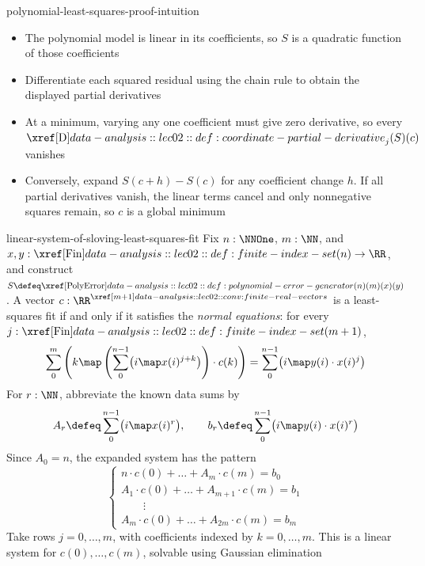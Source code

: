 \documentclass[12pt]{article}
\numberwithin{figure}{section}
\begin{document}
\begin{rem}{polynomial-least-squares-proof-intuition}
    \begin{itemize}[nosep]
        \item The polynomial model is linear in its coefficients, so $S$
            is a quadratic function of those coefficients
        \item Differentiate each squared residual using the chain rule
            to obtain the displayed partial derivatives
        \item At a minimum, varying any one coefficient must give zero
            derivative, so every $\PartialD_j(S)(c)$ vanishes
        \item Conversely, expand $S(c+h)-S(c)$ for any coefficient change
            $h$. If all partial derivatives vanish, the linear terms
            cancel and only nonnegative squares remain, so $c$ is a
            global minimum
    \end{itemize}
\end{rem}

\begin{thm}{linear-system-of-sloving-least-squares-fit}
    \hypertarget{notes.conv.linear-system-of-sloving-least-squares-fit}{}
    \label{conv:linear-system-of-sloving-least-squares-fit}
    Fix $n:\NNOne$, $m:\NN$, and $x,y:\Fin(n)\to\RR$, and construct
    $S\defeq\PolyError(n)(m)(x)(y)$. A vector $c:\RealVectors{m+1}$
    is a least-squares fit if and only if it satisfies the
    \emph{normal equations}: for every $j:\Fin(m+1)$,
    \[
      \sum_0^m\left(k\map
        \left(\sum_0^{n-1}\bigl(i\map x(i)^{j+k}\bigr)\right)
        \cdot c(k)\right)
      =\sum_0^{n-1}\bigl(i\map y(i)\cdot x(i)^j\bigr)
    \]
    For $r:\NN$, abbreviate the known data sums by
    \[
      A_r\defeq\sum_0^{n-1}\bigl(i\map x(i)^r\bigr),\qquad
      b_r\defeq\sum_0^{n-1}\bigl(i\map y(i)\cdot x(i)^r\bigr)
    \]
    Since $A_0=n$, the expanded system has the pattern
    \[
      \begin{cases}
        n\cdot c(0)+\ldots+A_m\cdot c(m)=b_0\\
        A_1\cdot c(0)+\ldots+A_{m+1}\cdot c(m)=b_1\\
        \qquad\vdots\\
        A_m\cdot c(0)+\ldots+A_{2m}\cdot c(m)=b_m
      \end{cases}
    \]
    Take rows $j=0,\ldots,m$, with coefficients indexed by $k=0,\ldots,m$.
    This is a linear system for $c(0),\ldots,c(m)$, solvable using
    Gaussian elimination
\end{thm}
\end{document}
